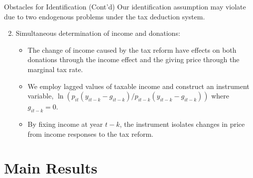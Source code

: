 \documentclass[
  ignorenonframetext,
  aspectratio=169,
]{beamer}
\providecommand{\tightlist}{%
  \setlength{\itemsep}{0pt}\setlength{\parskip}{0pt}}
\begin{document}
\begin{frame}{Obstacles for Identification (Cont'd)}
\protect\hypertarget{obstacles-for-identification-contd}{}
Our identification assumption may violate due to two endogenous problems under the tax deduction system.

\begin{enumerate}
\setcounter{enumi}{1}
\tightlist
\item
  Simultaneous determination of income and donations:

  \begin{itemize}
  \tightlist
  \item
    The change of income caused by the tax reform have effects on both donations through the income effect and the giving price through the marginal tax rate.
  \item
    We employ lagged values of taxable income and construct an instrument variable, \(\ln (p_{it}(y_{it-k} - g_{it-k})/p_{it-k}(y_{it-k} - g_{it-k}))\) where \(g_{it-k} = 0\).
  \item
    By fixing income at year \(t - k\), the instrument isolates changes in price from income responses to the tax reform.
  \end{itemize}
\end{enumerate}
\end{frame}

\hypertarget{main-results}{%
\section{Main Results}\label{main-results}}
\end{document}
